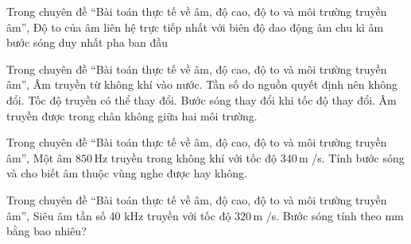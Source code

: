 \begin{ex}
Trong chuyên đề “Bài toán thực tế về âm, độ cao, độ to và môi trường truyền âm”, Độ to của âm liên hệ trực tiếp nhất với
\choice
{\True biên độ dao động âm}
{chu kì âm}
{bước sóng duy nhất}
{pha ban đầu}
\end{ex}

\begin{ex}
Trong chuyên đề “Bài toán thực tế về âm, độ cao, độ to và môi trường truyền âm”, Âm truyền từ không khí vào nước.
\choiceTF
{\True Tần số do nguồn quyết định nên không đổi.}
{\True Tốc độ truyền có thể thay đổi.}
{\True Bước sóng thay đổi khi tốc độ thay đổi.}
{Âm truyền được trong chân không giữa hai môi trường.}
\end{ex}

\begin{ex}
Trong chuyên đề “Bài toán thực tế về âm, độ cao, độ to và môi trường truyền âm”, Một âm $850\,\text{Hz}$ truyền trong không khí với tốc độ $340\,\text{m}$ /s. Tính bước sóng và cho biết âm thuộc vùng nghe được hay không.
\choiceTF

\end{ex}

\begin{ex}
Trong chuyên đề “Bài toán thực tế về âm, độ cao, độ to và môi trường truyền âm”, Siêu âm tần số 40 kHz truyền với tốc độ $320\,\text{m}$ /s. Bước sóng tính theo mm bằng bao nhiêu?
\end{ex}

